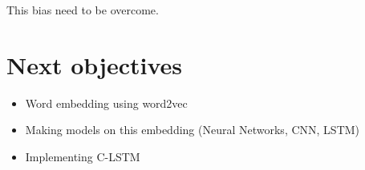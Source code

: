 \documentclass[11pt,a4paper,oneside]{report}
\begin{document}
This bias need to be overcome.

\section{Next objectives}
\begin{itemize}
	\item Word embedding using word2vec
	\item Making models on this embedding (Neural Networks, CNN, LSTM)
	\item Implementing C-LSTM \cite{Zhou2015}
\end{itemize}



\end{document}
